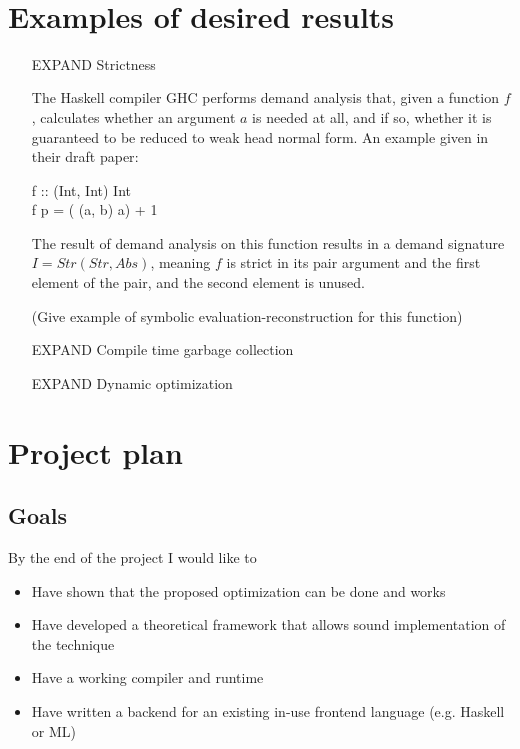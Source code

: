 \documentclass[a4paper]{article}
\begin{document}
\mbox{}\\


\section{Examples of desired results}

\begin{itemize}

\item [EXPAND]Strictness

The Haskell compiler GHC performs demand analysis that, given a function $f$, calculates whether an argument $a$ is needed at all, and if so, whether it is guaranteed to be reduced to weak head normal form. An example given in their draft paper\cite{demand_analysis}:

\begin{haskell*}
  f :: (Int, Int) \to Int\\
  f p = ( (a, b) \to a) + 1
\end{haskell*}

The result of demand analysis on this function results in a demand signature $I = Str(Str,Abs)$, meaning $f$ is strict in its pair argument and the first element of the pair, and the second element is unused.

(Give example of symbolic evaluation-reconstruction for this function)

\item [EXPAND]Compile time garbage collection

\item [EXPAND]Dynamic optimization


\end{itemize}


\section{Project plan}

\subsection{Goals}

By the end of the project I would like to

\begin{itemize}
\item Have shown that the proposed optimization can be done and works
\item Have developed a theoretical framework that allows sound implementation of the technique
\item Have a working compiler and runtime
\item Have written a backend for an existing in-use frontend language (e.g. Haskell or ML)
\end{itemize}
\end{document}
